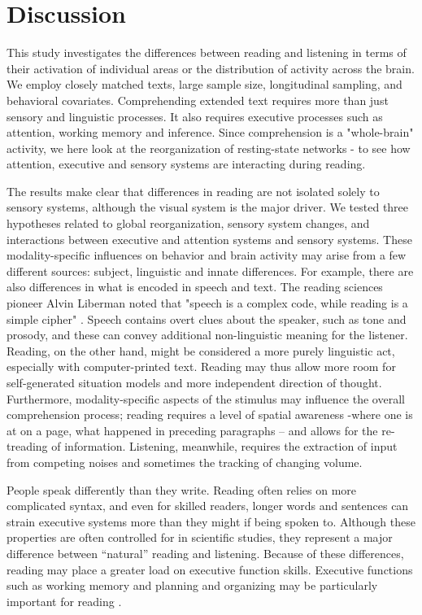 \section{Discussion}

This study investigates the differences between reading and listening in terms of their activation of individual areas or the distribution of activity across the brain. We employ closely matched texts, large sample size, longitudinal sampling, and behavioral covariates. Comprehending extended text requires more than just sensory and linguistic processes. It also requires executive processes such as attention, working memory and inference. Since comprehension is a "whole-brain" activity, we here look at the reorganization of resting-state networks - to see how attention, executive and sensory systems are interacting during reading.

The results make clear that differences in reading are not isolated solely to sensory systems, although the visual system is the major driver. We tested three hypotheses related to global reorganization, sensory system changes, and interactions between executive and attention systems and sensory systems. These modality-specific influences on behavior and brain activity may arise from a few different sources: subject, linguistic and innate differences. For example, there are also differences in what is encoded in speech and text. The reading sciences pioneer Alvin Liberman noted that "speech is a complex code, while reading is a simple cipher" \cite{Mattingly1971}. Speech contains overt clues about the speaker, such as tone and prosody, and these can convey additional non-linguistic meaning for the listener. Reading, on the other hand, might be considered a more purely linguistic act, especially with computer-printed text. Reading may thus allow more room for self-generated situation models and more independent direction of thought. Furthermore, modality-specific aspects of the stimulus may influence the overall comprehension process; reading requires a level of spatial awareness -where one is at on a page, what happened in preceding paragraphs – and allows for the re-treading of information. Listening, meanwhile, requires the extraction of input from competing noises and sometimes the tracking of changing volume. 

People speak differently than they write. Reading often relies on more complicated syntax, and even for skilled readers, longer words and sentences can strain executive systems more than they might if being spoken to. Although these properties are often controlled for in scientific studies, they represent a major difference between “natural” reading and listening. Because of these differences, reading may place a greater load on executive function skills. Executive functions such as working memory and planning and organizing may be particularly important for reading \citep{Cain2006}.  


